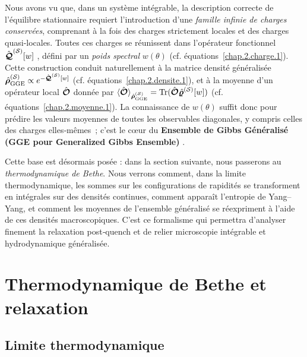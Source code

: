 Nous avons vu que, dans un système intégrable, la description correcte de l’équilibre stationnaire requiert l’introduction d’une \emph{famille infinie de charges conservées}, comprenant à la fois des charges strictement locales et des charges quasi‑locales.
Toutes ces charges se réunissent dans l’opérateur fonctionnel
\(
\hat{\bm{\mathcal{Q}}}^{(\mathcal{S})}[w]
\)
, défini par un \emph{poids spectral}  $w(\theta)$ (cf. équations~\eqref{chap.2.charge.1}).
Cette construction conduit naturellement à la matrice densité généralisée
\(
\hat{\bm{\rho}}^{(\mathcal{S})}_{\mathrm{GGE}}  \propto  e^{-\hat{\bm{\mathcal{Q}}}^{(\mathcal{S})}[w]}
\) 
(cf. équations~\eqref{chap.2.densite.1}), et à la moyenne d’un opérateur local $\hat{\bm{\mathcal{O}}}$ donnée par
\(
\langle \hat{\bm{\mathcal{O}}}\rangle_{\hat{\bm{\rho}}^{(\mathcal{S})}_{\mathrm{GGE}}}  =  \displaystyle  \text{Tr} (\hat{\bm{\mathcal{O}}}\hat{\bm{\varrho}}^{(\mathcal{S})}[w])
\)
(cf. équations~\eqref{chap.2.moyenne.1}).
La connaissance de $w(\theta)$ suffit donc pour prédire les valeurs moyennes de toutes les observables diagonales, y compris celles des charges elles‑mêmes ; c’est le cœur du {\bf Ensemble de Gibbs Généralisé (GGE pour Generalized Gibbs Ensemble)} .

\medskip
Cette base est désormais posée : dans la section suivante, nous passerons au \emph{thermodynamique de Bethe}.
Nous verrons comment, dans la limite thermodynamique, les sommes sur les configurations de rapidités se transforment en intégrales sur des densités continues, comment apparaît l’entropie de Yang–Yang, et comment les moyennes de l’ensemble généralisé se réexpriment à l’aide de ces densités macroscopiques.
C’est ce formalisme qui permettra d’analyser finement la relaxation post‑quench et de relier microscopie intégrable et hydrodynamique généralisée.



%

\section{Thermodynamique de Bethe et relaxation}

\subsection{Limite thermodynamique}

